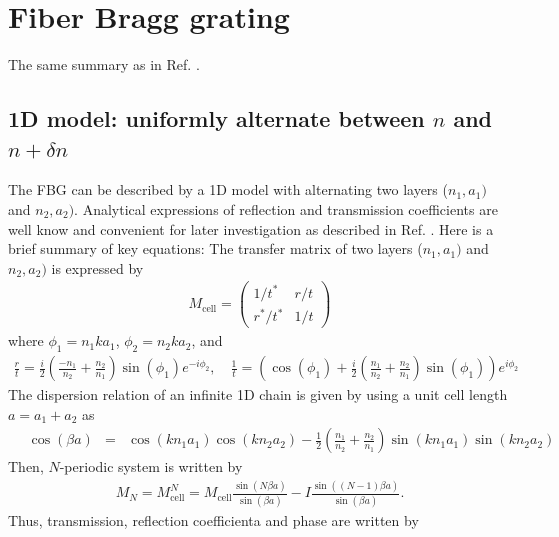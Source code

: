 \documentclass[aps,pra, onecolumn,superscriptaddress,nopacs,floatfix, showkeys, notitlepage]{revtex4-1}
\begin{document}
\appendix




\newpage

\section{Fiber Bragg grating}
The same summary as in Ref. \cite{note_temp}.
\label{app:1dmodel}
\subsection{1D model: uniformly alternate between $n$ and $n+\delta n$}
The FBG can be described by a 1D model with alternating two layers ($n_1, a_1)$ and $n_2, a_2)$. 
Analytical expressions of reflection and transmission coefficients are well know and convenient for later investigation as described in Ref. \cite{Bendickson1996}.
Here is a brief summary of key equations:
The transfer matrix of two layers ($n_1, a_1)$ and $n_2, a_2)$ is expressed by
\begin{eqnarray}
    M_{\mathrm{cell}}=\left(\begin{array}{cc}
1 / t^* & r / t \\
r^* / t^* & 1 / t
\end{array}\right)
\label{eq:tmat}
\end{eqnarray}
where $\phi_1=n_1 k a_1$, $\phi_2=n_2 k a_2$, and
\begin{eqnarray}
\frac{r}{t}  =\frac{i}{2}\left(\frac{-n_1}{n_2}+\frac{n_2}{n_1}\right) \sin \left(\phi_1\right) e^{-i\phi_2}, \quad
\frac{1}{t}  =\left(\cos \left(\phi_1\right)+\frac{i}{2}\left(\frac{n_1}{n_2}+\frac{n_2}{n_1}\right) \sin \left(\phi_1\right)\right) e^{i\phi_2}
\end{eqnarray}
The dispersion relation of an infinite 1D chain is given by using a unit cell length $a=a_1+a_2$ as
\begin{eqnarray}
    \quad \cos (\beta a)&=&\cos \left(k n_1 a_1\right) \cos \left(k n_2 a_2\right)-\frac{1}{2}\left(\frac{n_1}{n_2}+\frac{n_2}{n_1}\right) \sin \left(k n_1 a_1\right) \sin \left(k n_2 a_2\right)
\end{eqnarray}
Then, $N$-periodic system is written by 
\begin{eqnarray}
    M_N=M_\mathrm{cell}^N = M_\mathrm{cell}\frac{\sin(N\beta a)}{\sin(\beta a)}-I\frac{\sin((N-1)\beta a)}{\sin(\beta a)}.
\end{eqnarray}
Thus, transmission, reflection coefficienta and phase are written by \cite{Bendickson1996}
\end{document}
